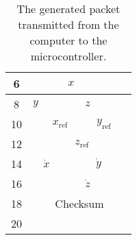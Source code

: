 \begin{table}[H]
\begin{tabular}{lclllllllllllllll}
		\multicolumn{1}{|c|}{6}    & \multicolumn{3}{c|}{}                                                    & \multicolumn{10}{c|}{$x$}                                                                                                                                                                                                                                  & \multicolumn{3}{c|}{}                                                       \\ \hline
		\multicolumn{1}{|c|}{8}    & \multicolumn{7}{c|}{$y$}                                                                                                                                                     & \multicolumn{9}{c|}{$z$}                                                                                                                                                                                                             \\ \hline
		\multicolumn{1}{|c|}{10}  & \multicolumn{1}{c|}{}  & \multicolumn{10}{c|}{$x_{\mathrm{ref}}$}              & \multicolumn{5}{c|}{$y_{\mathrm{ref}}$}                                                                                                  \\ \hline
		\multicolumn{1}{|c|}{12}   & \multicolumn{5}{c|}{}                                                                                                      & \multicolumn{10}{c|}{$z_{\mathrm{ref}}$}                                                                                                                                                                                                                              & \multicolumn{1}{c|}{}   \\ \hline
		\multicolumn{1}{|c|}{14}   & \multicolumn{10}{c|}{$\dot{x}$}& \multicolumn{6}{c|}{$\dot{y}$}                                                       \\ \hline
		\multicolumn{1}{|c|}{16}   & \multicolumn{5}{c|}{}                                                                                                      & \multicolumn{11}{c|}{$\dot{z}$}                                                                                                                                                                                                                                                        \\ \hline
		\multicolumn{1}{|c|}{18}   & \multicolumn{16}{c|}{Checksum}                                                       \\ \hline
		\multicolumn{1}{|c|}{20}  & \multicolumn{8}{c|}{}                                                                                                                                                                                 & \multicolumn{1}{c|}{}  & \multicolumn{1}{c|}{}  & \multicolumn{1}{c|}{}   & \multicolumn{1}{c|}{}   & \multicolumn{1}{c|}{}   & \multicolumn{1}{c|}{}   & \multicolumn{1}{c|}{}   & \multicolumn{1}{c|}{}   \\ \hline
	\end{tabular}
	\caption{The generated packet transmitted from the computer to the microcontroller.}
	\label{tab:packetstructure2}
\end{table}

